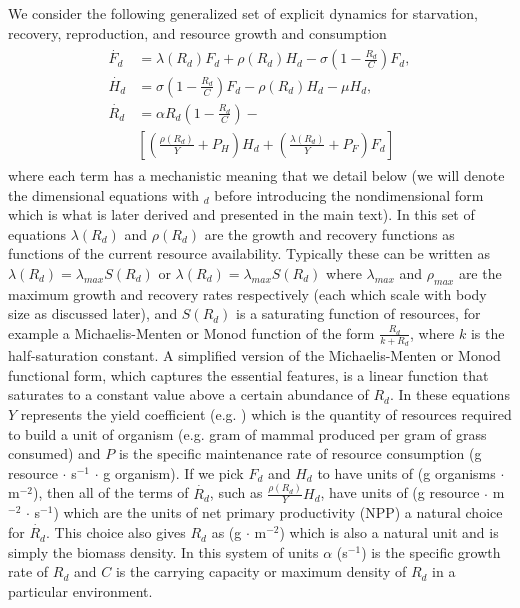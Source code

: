 \documentclass{pnastwo}
\begin{document}
\begin{article}
We consider the following generalized set of explicit dynamics for starvation, recovery, reproduction, and resource growth and consumption
\begin{align}
\begin{split}
\dot{F_{d}} &= \lambda\left(R_{d}\right) F_{d} + \rho\left(R_{d}\right)H_{d} - \sigma \left(1-\frac{R_{d}}{C}\right)F_{d},  \\
\dot{H_{d}} &= \sigma \left(1-\frac{R_{d}}{C}\right)F_{d} - \rho\left(R_{d}\right)H_{d} - \mu H_{d},  \\
\dot{R_{d}} &= \alpha R_{d}\left(1-\frac{R_{d}}{C}\right) - \\
&\left[\left(\frac{\rho\left(R_{d}\right)}{Y}+P_{H}\right)H_{d}+\left(\frac{\lambda\left(R_{d}\right)}{Y}+P_{F}\right)F_{d}\right]
\end{split}
\end{align}
where each term has a mechanistic meaning that we detail below (we will denote the dimensional equations with $_{d}$ before introducing the nondimensional form which is what is later derived and presented in the main text).
In this set of equations $\lambda\left(R_{d}\right)$ and $\rho\left(R_{d}\right)$ are the growth and recovery functions as functions of the current resource availability. Typically these can be written as $\lambda\left(R_{d}\right)=\lambda_{max}S\left(R_{d}\right)$ or $\lambda\left(R_{d}\right)=\lambda_{max}S\left(R_{d}\right)$ where $\lambda_{max}$ and $\rho_{max}$ are the maximum growth and recovery rates respectively (each which scale with body size as discussed later), and $S\left(R_{d}\right)$ is a saturating function of resources, for example a Michaelis-Menten or Monod function of the form $\frac{R_{d}}{k+R_{d}}$, where $k$ is the half-saturation constant. A simplified version of the Michaelis-Menten or Monod functional form, which captures the essential features, is a linear function that saturates to a constant value above a certain abundance of $R_{d}$. In these equations $Y$ represents the yield coefficient (e.g. \cite{pirt,Heijnen}) which is the quantity of resources required to build a unit of organism (e.g. gram of mammal produced per gram of grass consumed) and $P$ is the specific maintenance rate of resource consumption (g resource $\cdot$ s$^{-1}$ $\cdot$ g organism). If we pick $F_{d}$ and $H_{d}$ to have units of (g organisms $\cdot$ m$^{-2}$), then all of the terms of $\dot{R_{d}}$, such as $\frac{\rho\left(R_{d}\right)}{Y}H_{d}$, have units of (g resource $\cdot$ m$^{-2}$ $\cdot$ s$^{-1}$) which are the units of net primary productivity (NPP) a natural choice for $\dot{R_{d}}$. This choice also gives $R_{d}$ as (g $\cdot$ m$^{-2}$) which is also a natural unit and is simply the biomass density. In this system of units $\alpha$ (s$^{-1}$) is the specific growth rate of $R_{d}$ and $C$ is the carrying capacity or maximum density of $R_{d}$ in a particular environment.


\end{article}
\end{document}
